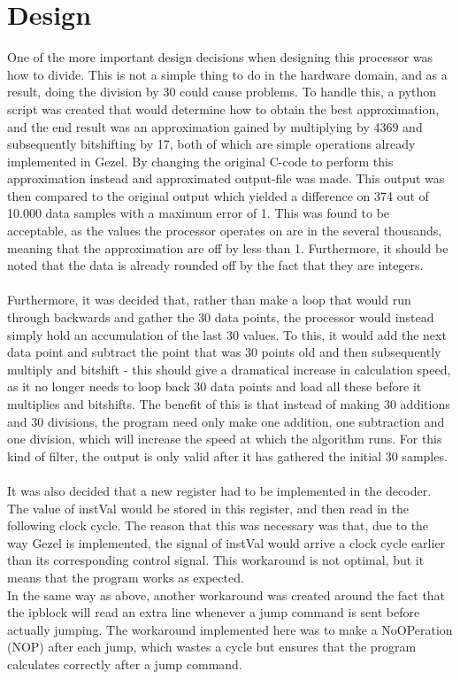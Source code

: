 \documentclass[12pt,a4paper]{article}
\begin{document}
\section{Design}
One of the more important design decisions when designing this processor was how to divide. This is not a simple thing to do in the hardware domain, and as a result, doing the division by 30 could cause problems. To handle this, a python script was created that would determine how to obtain the best approximation, and the end result was an approximation gained by multiplying by 4369 and subsequently bitshifting by 17, both of which are simple operations already implemented in Gezel. By changing the original C-code to perform this approximation instead and approximated output-file was made. This output was then compared to the original output which yielded a difference on 374 out of 10.000 data samples with a maximum error of 1. This was found to be acceptable, as the values the processor operates on are in the several thousands, meaning that the approximation are off by less than 1\textperthousand. Furthermore, it should be noted that the data is already rounded off by the fact that they are integers.\\
\\
Furthermore, it was decided that, rather than make a loop that would run through backwards and gather the 30 data points, the processor would instead simply hold an accumulation of the last 30 values. To this, it would add the next data point and subtract the point that was 30 points old and then subsequently multiply and bitshift - this should give a dramatical increase in calculation speed, as it no longer needs to loop back 30 data points and load all these before it multiplies and bitshifts. The benefit of this is that instead of making 30 additions and 30 divisions, the program need only make one addition, one subtraction and one division, which will increase the speed at which the algorithm runs. For this kind of filter, the output is only valid after it has gathered the initial 30 samples.\\
\\
It was also decided that a new register had to be implemented in the decoder. The value of instVal would be stored in this register, and then read in the following clock cycle. The reason that this was necessary was that, due to the way Gezel is implemented, the signal of instVal would arrive a clock cycle earlier than its corresponding control signal. This workaround is not optimal, but it means that the program works as expected.\\
In the same way as above, another workaround was created around the fact that the ipblock will read an extra line whenever a jump command is sent before actually jumping. The workaround implemented here was to make a NoOPeration (NOP) after each jump, which wastes a cycle but ensures that the program calculates correctly after a jump command.\\
\\
\end{document}
